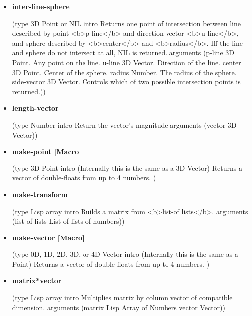 \documentclass [11pt]{book}
\begin{document}
\begin{itemize}
\item {}
\label{prim:inter-line-sphere}
\textbf{inter-line-sphere}

(type 3D Point or NIL intro
  Returns one point of intersection between line described by
point <b>p-line</b> and direction-vector <b>u-line</b>, and sphere described by
<b>center</b> and <b>radius</b>. Iff the line and sphere do not intersect at
all, NIL is returned.
 arguments
 (p-line 3D Point. Any point on the line. u-line
  3D Vector. Direction of the line. center
  3D Point. Center of the sphere. radius
  Number. The radius of the sphere. side-vector
  3D Vector. Controls which of two possible intersection points is returned.))



\item {}
\label{prim:length-vector}
\textbf{length-vector}

(type Number intro  Return the vector's magnitude
 arguments (vector 3D Vector))



\item {}
\label{prim:make-point}
\textbf{make-point [Macro]}

(type 3D Point intro
  (Internally this is the same as a 3D Vector) Returns a vector of double-floats from up to 4 numbers.
)



\item {}
\label{prim:make-transform}
\textbf{make-transform}

(type Lisp array intro  Builds a matrix from <b>list-of lists</b>.
 arguments (list-of-lists List of lists of numbers))



\item {}
\label{prim:make-vector}
\textbf{make-vector [Macro]}

(type 0D, 1D, 2D, 3D, or 4D Vector intro
  (Internally this is the same as a Point)
Returns a vector of double-floats from up to 4 numbers.
)



\item {}
\label{prim:matrix*vector}
\textbf{matrix*vector}

(type Lisp array intro
  Multiplies matrix by column vector of compatible dimension.
 arguments (matrix Lisp Array of Numbers vector Vector))




\end{itemize}
\end{document}
